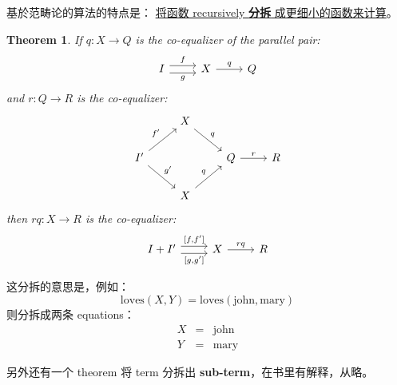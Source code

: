 \documentclass[12pt, orivec]{article}
\newtheorem{theorem}{Theorem}
\begin{document}
基於范畴论的算法的特点是： \uline{将函数 recursively \textbf{分拆} 成更细小的函数来计算}。 

\begin{theorem}
If $q: X \rightarrow Q$ is the co-equalizer of the parallel pair:
\begin{equation}
\begin{tikzcd}
I \ar[r,shift left=.75ex,"f"]
  \ar[r,shift right=.75ex,swap,"g"]
& X \ar[r, "q"] & Q
\end{tikzcd}
\end{equation}
and $r: Q \rightarrow R$ is the co-equalizer:
\begin{equation}
\begin{tikzcd}
& X \ar[dr, "q"] & \\
I' \ar[ur, "f'"]
   \ar[dr, "g'"]
& & Q \ar[r, "r"] & R\\
& X \ar[ur,"q"] &
\end{tikzcd}
\end{equation}
then $rq:  X \rightarrow R$ is the co-equalizer:
\begin{equation}
\begin{tikzcd}
I + I' \arrow[shift left=.75ex]{r}{[f, f']}
       \arrow[shift right=.75ex,swap]{r}{[g, g']}
& X \ar[r, "rq"] & R
\end{tikzcd}
\end{equation}
\end{theorem}

这分拆的意思是，例如： 
\begin{equation}
\mbox{loves}(X, Y) = \mbox{loves}(\mbox{john}, \mbox{mary})
\end{equation}
则分拆成两条 equations：
\begin{eqnarray}
X &=& \mbox{john} \\
Y &=& \mbox{mary}
\end{eqnarray}

另外还有一个 theorem 将 term 分拆出 \textbf{sub-term}，在书里有解释，从略。 
\end{document}
